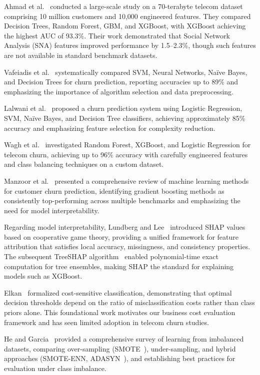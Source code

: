 \documentclass[10pt, conference, letterpaper]{IEEEtran}
\begin{document}
Ahmad et al.~\cite{ahmad2019churn} conducted a large-scale study on a 70-terabyte telecom dataset comprising 10 million customers and 10,000 engineered features. They compared Decision Trees, Random Forest, GBM, and XGBoost, with XGBoost achieving the highest AUC of 93.3\%. Their work demonstrated that Social Network Analysis (SNA) features improved performance by 1.5--2.3\%, though such features are not available in standard benchmark datasets.

Vafeiadis et al.~\cite{vafeiadis2015comparison} systematically compared SVM, Neural Networks, Na\"ive Bayes, and Decision Trees for churn prediction, reporting accuracies up to 89\% and emphasizing the importance of algorithm selection and data preprocessing.

Lalwani et al.~\cite{lalwani2022churn} proposed a churn prediction system using Logistic Regression, SVM, Na\"ive Bayes, and Decision Tree classifiers, achieving approximately 85\% accuracy and emphasizing feature selection for complexity reduction.

Wagh et al.~\cite{wagh2024churn} investigated Random Forest, XGBoost, and Logistic Regression for telecom churn, achieving up to 96\% accuracy with carefully engineered features and class balancing techniques on a custom dataset.

Manzoor et al.~\cite{manzoor2024review} presented a comprehensive review of machine learning methods for customer churn prediction, identifying gradient boosting methods as consistently top-performing across multiple benchmarks and emphasizing the need for model interpretability.

Regarding model interpretability, Lundberg and Lee~\cite{lundberg2017shap} introduced SHAP values based on cooperative game theory, providing a unified framework for feature attribution that satisfies local accuracy, missingness, and consistency properties. The subsequent TreeSHAP algorithm~\cite{lundberg2020treeshap} enabled polynomial-time exact computation for tree ensembles, making SHAP the standard for explaining models such as XGBoost.

Elkan~\cite{elkan2001cost} formalized cost-sensitive classification, demonstrating that optimal decision thresholds depend on the ratio of misclassification costs rather than class priors alone. This foundational work motivates our business cost evaluation framework and has seen limited adoption in telecom churn studies.

He and Garcia~\cite{he2009imbalanced} provided a comprehensive survey of learning from imbalanced datasets, comparing over-sampling (SMOTE~\cite{chawla2002smote}), under-sampling, and hybrid approaches (SMOTE-ENN, ADASYN~\cite{he2008adasyn}), and establishing best practices for evaluation under class imbalance.
\end{document}
